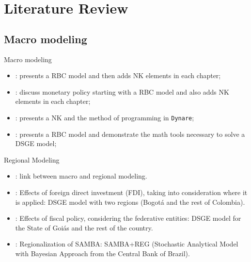 \documentclass[presentation.tex]{subfiles}
\begin{document}
\section{Literature Review}


\subsection{Macro modeling}

\begin{frame}[fragile]{Macro modeling}
	
	\begin{itemize}
		
		\item \textcite{costa_junior_understanding_2016}: presents a RBC model and then adds NK elements in each chapter;
		
		\item \textcite{gali_monetary_2015}: discuss monetary policy starting with a RBC model and also adds NK elements in each chapter;
		
		\item \textcite{bergholt_basic_2012}: presents a NK and the method of programming in \texttt{Dynare};
		
		\item \textcite{solis-garcia_ucb_2022}: presents a RBC model and demonstrate the math tools necessary to solve a DSGE model;
				
	\end{itemize}
	
\end{frame}


\begin{frame}[fragile]{Regional Modeling}

\begin{itemize}

	\item \textcite{rickman_modern_2010}: link between macro and regional modeling.

	\item \textcite{mora_fdi_2019}: Effects of foreign direct investment (FDI), taking into consideration where it is applied: DSGE model with two regions (Bogotá and the rest of Colombia).

	\item \textcite{costa_junior_dsge_2022}: Effects of fiscal policy, considering the federative entities: DSGE model for the State of Goiás and the rest of the country.
	
	\item \textcite{osterno_uma_2022}: Regionalization of SAMBA: SAMBA+REG (Stochastic Analytical Model with Bayesian Approach from the Central Bank of Brazil).
	
\end{itemize}
		
\end{frame}
\end{document}

